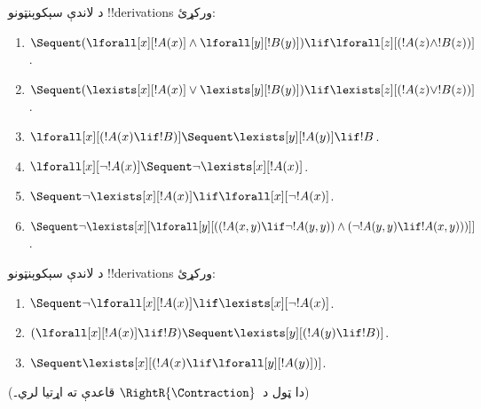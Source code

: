 \documentclass[../../../include/open-logic-section]{subfiles}
\begin{document}
\begin{prob}
د لاندې سېکوېنټونو !!{derivation}s ورکړئ:
\begin{enumerate}
\item $\Sequent (\lforall[x][!A(x)] \land \lforall[y][!B(y)]) \lif
\lforall[z][(!A(z) \land !B(z))]$.
\item $\Sequent (\lexists[x][!A(x)] \lor \lexists[y][!B(y)]) \lif
\lexists[z][(!A(z) \lor !B(z))]$.
\item $\lforall[x][(!A(x) \lif !B)] \Sequent \lexists[y][!A(y)] \lif !B$.
\item $\lforall[x][\lnot !A(x)] \Sequent \lnot\lexists[x][!A(x)]$.
\item $\Sequent \lnot\lexists[x][!A(x)] \lif \lforall[x][\lnot !A(x)]$.
\item $\Sequent \lnot\lexists[x][\lforall[y][((!A(x,y) \lif \lnot
!A(y,y)) \land (\lnot !A(y,y) \lif !A(x,y)))]]$.
\end{enumerate}
\end{prob}

\begin{prob}
د لاندې سېکوېنټونو !!{derivation}s ورکړئ:
\begin{enumerate}
\item $\Sequent \lnot\lforall[x][!A(x)] \lif \lexists[x][\lnot!A(x)]$.
\item $(\lforall[x][!A(x)] \lif !B) \Sequent \lexists[y][(!A(y) \lif !B)]$.
\item $\Sequent \lexists[x][(!A(x) \lif \lforall[y][!A(y)])]$.
\end{enumerate}
(دا ټول د~$\RightR{\Contraction}$ قاعدې ته اړتيا لري۔)
\end{prob}
\end{document}
